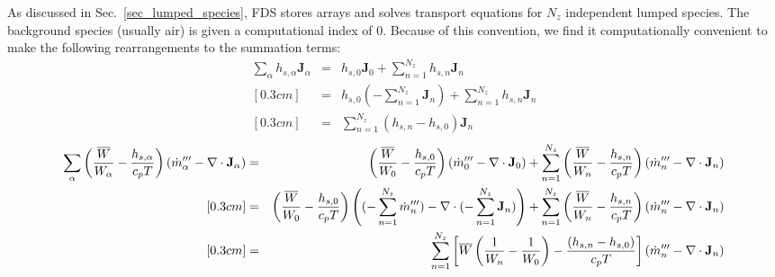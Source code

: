 As discussed in Sec.~\ref{sec_lumped_species}, FDS stores arrays and solves transport equations for $N_z$ independent lumped species.  The background species (usually air) is given a computational index of 0.  Because of this convention, we find it computationally convenient to make the following rearrangements to the summation terms:
\begin{eqnarray}
\label{eqn_hdiff_1}
\sum_\alpha h_{s,\alpha} \mathbf{J}_\alpha &=& h_{s,0} \mathbf{J}_0  + \sum_{n=1}^{N_z} h_{s,n} \mathbf{J}_n  \nonumber\\ [0.3cm]
&=& h_{s,0} \left(-\sum_{n=1}^{N_z} \mathbf{J}_n \right) + \sum_{n=1}^{N_z} h_{s,n} \mathbf{J}_n  \nonumber\\ [0.3cm]
&=& \sum_{n=1}^{N_z} (h_{s,n}-h_{s,0}) \mathbf{J}_n
\end{eqnarray}
\begin{eqnarray}
\label{eqn_hdiff_2}
\sum_\alpha \left( \frac{\overline{W}}{W_\alpha} - \frac{h_{s,\alpha}}{c_p T} \right)  \left(\dot{m}_\alpha^{{\prime\prime\prime}} - \nabla\cdot\mathbf{J}_{\alpha} \right)
&=& \left( \frac{\overline{W}}{W_0} - \frac{h_{s,0}}{c_p T} \right)  \left(\dot{m}_0^{\prime\prime\prime} - \nabla\cdot\mathbf{J}_0 \right) + \sum_{n=1}^{N_z} \left( \frac{\overline{W}}{W_n} - \frac{h_{s,n}}{c_p T} \right)  \left(\dot{m}_n^{\prime\prime\prime} - \nabla\cdot\mathbf{J}_n \right) \nonumber\\ [0.3cm]
&=& \left( \frac{\overline{W}}{W_0} - \frac{h_{s,0}}{c_p T} \right)  \left((-\sum_{n=1}^{N_z}\dot{m}_n^{\prime\prime\prime}) - \nabla\cdot(-\sum_{n=1}^{N_z}\mathbf{J}_n) \right) + \sum_{n=1}^{N_z} \left( \frac{\overline{W}}{W_n} - \frac{h_{s,n}}{c_p T} \right)  \left(\dot{m}_n^{\prime\prime\prime} - \nabla\cdot\mathbf{J}_n \right) \nonumber\\ [0.3cm]
&=& \sum_{n=1}^{N_z} \left[ \overline{W}\left(\frac{1}{W_n} - \frac{1}{W_0}\right) - \frac{(h_{s,n}-h_{s,0})}{c_p T} \right]  \left(\dot{m}_n^{\prime\prime\prime} - \nabla\cdot\mathbf{J}_n \right)
\end{eqnarray}
\vspace{0.3cm}

